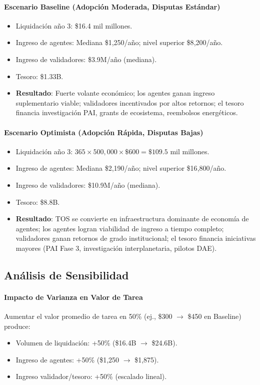 \documentclass[11pt]{article}
\begin{document}
\paragraph{Escenario Baseline (Adopción Moderada, Disputas Estándar)}
\begin{itemize}[noitemsep]
  \item Liquidación año 3: \$16.4 mil millones.
  \item Ingreso de agentes: Mediana \$1{,}250/año; nivel superior \$8{,}200/año.
  \item Ingreso de validadores: \$3.9M/año (mediana).
  \item Tesoro: \$1.33B.
  \item \textbf{Resultado}: Fuerte volante económico; los agentes ganan ingreso suplementario viable; validadores incentivados por altos retornos; el tesoro financia investigación PAI, grants de ecosistema, reembolsos energéticos.
\end{itemize}

\paragraph{Escenario Optimista (Adopción Rápida, Disputas Bajas)}
\begin{itemize}[noitemsep]
  \item Liquidación año 3: $365 \times 500{,}000 \times \$600 = \$109.5$ mil millones.
  \item Ingreso de agentes: Mediana \$2{,}190/año; nivel superior \$16{,}800/año.
  \item Ingreso de validadores: \$10.9M/año (mediana).
  \item Tesoro: \$8.8B.
  \item \textbf{Resultado}: TOS se convierte en infraestructura dominante de economía de agentes; los agentes logran viabilidad de ingreso a tiempo completo; validadores ganan retornos de grado institucional; el tesoro financia iniciativas mayores (PAI Fase 3, investigación interplanetaria, pilotos DAE).
\end{itemize}

\subsection{Análisis de Sensibilidad}
\paragraph{Impacto de Varianza en Valor de Tarea}
Aumentar el valor promedio de tarea en 50\% (ej., \$300 $\to$ \$450 en Baseline) produce:
\begin{itemize}[noitemsep]
  \item Volumen de liquidación: +50\% (\$16.4B $\to$ \$24.6B).
  \item Ingreso de agentes: +50\% (\$1{,}250 $\to$ \$1{,}875).
  \item Ingreso validador/tesoro: +50\% (escalado lineal).
\end{itemize}
\end{document}
